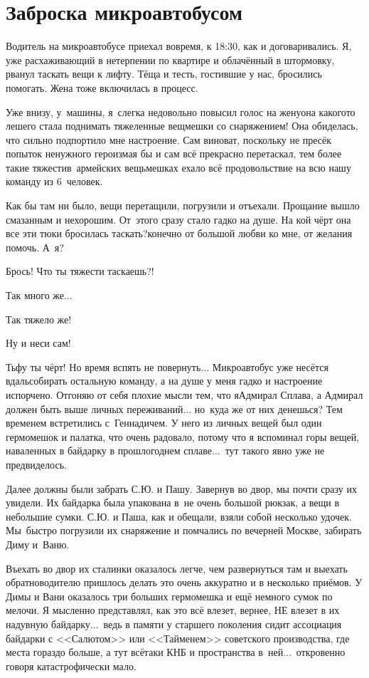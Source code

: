 \chapter{Заброска микроавтобусом} 
\vspace{-1cm}
\vepsianrose

Водитель на микроавтобусе приехал вовремя, к 18:30, как и договаривались. Я, уже расхаживающий в нетерпении по квартире и облачённый в штормовку, рванул таскать вещи к лифту. Тёща и тесть, гостившие у нас, бросились помогать. Жена тоже включилась в процесс. 

Уже внизу, у~машины, я~слегка недовольно повысил голос на жену\mdash она какого\sdash то лешего стала поднимать тяжеленные вещмешки со снаряжением! Она обиделась, что сильно подпортило мне настроение. Сам виноват, поскольку не пресёк попыток ненужного героизма\mdash я бы и сам всё прекрасно перетаскал, тем более такие тяжести\mdash в~армейских вещьмешках ехало всё продовольствие на всю нашу команду из 6~человек. 

Как бы там ни было, вещи перетащили, погрузили и отъехали. Прощание вышло смазанным и нехорошим. От~этого сразу стало гадко на душе. На кой чёрт она все эти тюки бросилась таскать?\mdash конечно от большой любви ко мне, от желания помочь. А~я?

\diagdash Брось! Что ты тяжести таскаешь?! 

\diagdash Так много же$\ldots$

\diagdash Так тяжело же!

\diagdash Ну и неси сам!

Тьфу ты чёрт! Но время вспять не повернуть$\ldots$ Микроавтобус уже несётся вдаль\mdash собирать остальную команду, а на душе у меня гадко и настроение испорчено. Отгоняю от себя плохие мысли тем, что я\mdash Адмирал Сплава, а Адмирал должен быть выше личных переживаний$\ldots$ но~куда же от них денешься? Тем временем встретились с~Геннадичем. У него из личных вещей был один гермомешок и палатка, что очень радовало, потому что я вспоминал горы вещей, наваленных в байдарку в прошлогоднем сплаве$\ldots$~тут такого явно уже не предвиделось.  

Далее должны были забрать С.Ю. и Пашу. Завернув во двор, мы почти сразу их увидели. Их байдарка была упакована в~не очень большой рюкзак, а вещи в небольшие сумки. С.Ю. и Паша, как и обещали, взяли собой несколько удочек. Мы~быстро погрузили их снаряжение и помчались по вечерней Москве, забирать Диму и~Ваню. 

Въехать во двор их сталинки оказалось легче, чем развернуться там и выехать обратно\mdash водителю пришлось делать это очень аккуратно и в несколько приёмов. У Димы и Вани оказалось три больших гермомешка и ещё немного сумок по мелочи. Я мысленно представлял, как это всё влезет, вернее, НЕ влезет в их надувную байдарку$\ldots$~ведь в памяти у старшего поколения сидит ассоциация байдарки с <<Салютом>> или <<Тайменем>> советского производства, где места гораздо больше, а тут всё\sdash таки КНБ и пространства в~ней$\ldots$~откровенно говоря катастрофически мало.


